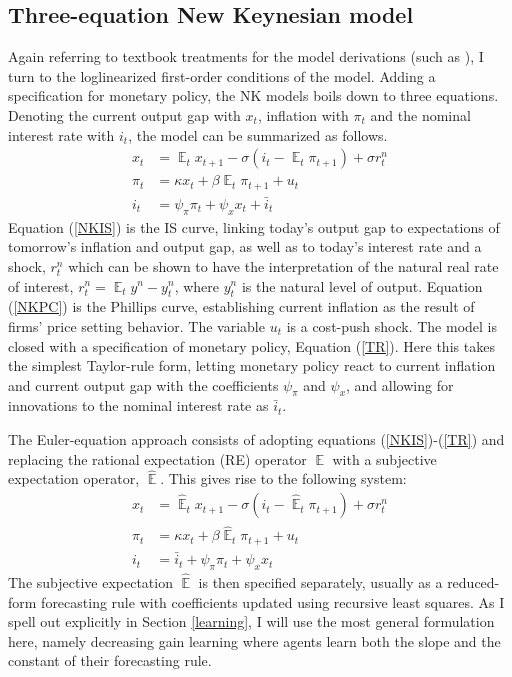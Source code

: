 \documentclass[11pt]{article}
\renewcommand{\[}{\begin{equation}}
\renewcommand{\]}{\end{equation}}
\DeclareMathOperator{\E}{\mathbb{E}}
\begin{document}
\subsection{Three-equation New Keynesian model}
Again referring to textbook treatments for the model derivations (such as \cite{woodford2011interest}), I turn to the loglinearized first-order conditions of the model. Adding a specification for monetary policy, the NK models boils down to three equations. Denoting the current output gap with $x_t$, inflation with $\pi_t$ and the nominal interest rate with $i_t$, the model can be summarized as follows.
\begin{align}
x_t &= \E_t x_{t+1} - \sigma(i_t - \E_t \pi_{t+1}) +\sigma r_t^n \label{NKIS} \\
\pi_t &= \kappa x_t +\beta \E_t \pi_{t+1} + u_t  \label{NKPC} \\
i_t &= \psi_{\pi}\pi_t + \psi_{x} x_t + \bar{i}_t \label{TR}
\end{align}
Equation (\ref{NKIS}) is the IS curve, linking today's output gap to expectations of tomorrow's inflation and output gap, as well as to today's interest rate and a shock, $r_t^n$ which can be shown to have the interpretation of the natural real rate of interest, $r_t^n = \E_t y^n - y_t^n$, where $y^n_t$ is the natural level of output. Equation (\ref{NKPC}) is the Phillips curve, establishing current inflation as the result of firms' price setting behavior. The variable $u_t$ is a cost-push shock. The model is closed with a specification of monetary policy, Equation (\ref{TR}). Here this takes the simplest Taylor-rule form, letting monetary policy react to current inflation and current output gap with the coefficients $\psi_{\pi}$ and $\psi_x$, and allowing for innovations to the nominal interest rate as $\bar{i}_t$.

The Euler-equation approach consists of adopting equations (\ref{NKIS})-(\ref{TR}) and replacing the rational expectation (RE) operator $\E$ with a subjective expectation operator, $\hat{\E}$. This gives rise to the following system:
\begin{align}
x_t &= \hat{\E}_t x_{t+1} - \sigma(i_t - \hat{\E}_t \pi_{t+1}) +\sigma r_t^n \label{prestons13} \\
\pi_t &= \kappa x_t +\beta \hat{\E}_t \pi_{t+1} + u_t \label{prestons14}  \\
i_t &= \bar{i}_t + \psi_{\pi}\pi_t + \psi_{x} x_t 
\end{align}
The subjective expectation $\hat{\E}$ is then specified separately, usually as a reduced-form forecasting rule with coefficients updated using recursive least squares. As I spell out explicitly in Section \ref{learning}, I will use the most general formulation here, namely decreasing gain learning where agents learn both the slope and the constant of their forecasting rule. 
\end{document}
